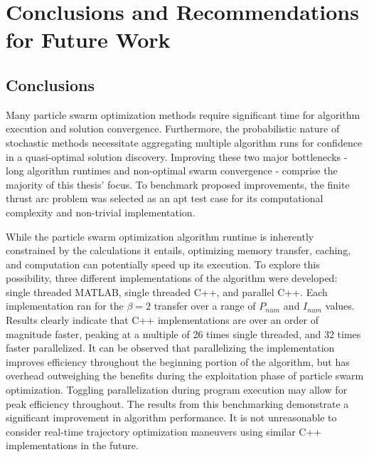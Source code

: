 \chapter{Conclusions and Recommendations for Future Work}

\section{Conclusions}
\noindent
Many particle swarm optimization methods
require significant time for algorithm execution and solution convergence. Furthermore, the probabilistic nature of stochastic methods necessitate aggregating multiple
algorithm runs for confidence in a quasi-optimal solution discovery. Improving these two major bottlenecks - long algorithm
runtimes and non-optimal swarm convergence - comprise the majority of this thesis' focus. 
To benchmark proposed improvements, the finite thrust arc problem was selected as an apt test case
for its computational complexity and non-trivial implementation. \newline

\noindent While the particle swarm optimization algorithm runtime is inherently constrained by the 
calculations it entails, optimizing memory transfer, caching, and computation can potentially speed up its
execution. To explore this possibility, three different implementations of the algorithm were developed:
single threaded MATLAB, single threaded C++, and parallel C++. Each implementation ran for the $\beta = 2$
transfer over a range of $P_{num}$ and $I_{num}$ values. Results clearly indicate that C++ implementations 
are over an order of magnitude faster, peaking at a multiple of 26 times single threaded, and 32 times faster
parallelized. It can be observed that parallelizing the implementation improves efficiency throughout the
beginning portion of the algorithm, but has overhead outweighing the benefits during the exploitation phase of
particle swarm optimization. Toggling parallelization during program execution may allow for peak
efficiency throughout. The results from this benchmarking demonstrate a significant improvement in 
algorithm performance. It is not unreasonable to consider real-time trajectory optimization maneuvers using 
similar C++ implementations in the future. \newline

